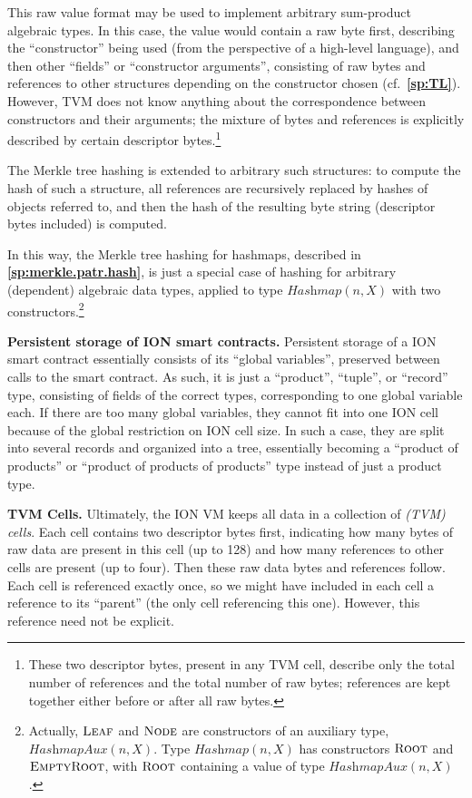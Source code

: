 \documentclass[12pt,oneside]{article}
\def\makepoint#1{\medbreak\noindent{\bf #1.\ }}
\def\nxsubpoint{\refstepcounter{subsubsection}%
  \smallbreak\makepoint{\thesubsubsection}}
\def\refpoint#1{{\rm\textbf{\ref{#1}}}}
\let\ptref=\refpoint
\def\embt(#1.){\textbf{#1.}}
\let\tp=\textit
\def\opsc#1{\operatorname{\textsc{#1}}}
\def\leaf{\opsc{Leaf}}
\def\node{\opsc{Node}}
\def\root{\opsc{Root}}
\def\emptyroot{\opsc{EmptyRoot}}
\def\Hashmap{\tp{Hashmap}}
\begin{document}
This raw value format may be used to implement arbitrary sum-product
algebraic types. In this case, the value would contain a raw byte
first, describing the ``constructor'' being used (from the perspective
of a high-level language), and then other ``fields'' or ``constructor
arguments'', consisting of raw bytes and references to other
structures depending on the constructor chosen
(cf.~\ptref{sp:TL}). However, TVM does not know anything about the
correspondence between constructors and their arguments; the mixture
of bytes and references is explicitly described by certain descriptor
bytes.\footnote{These two descriptor bytes, present in any TVM cell,
  describe only the total number of references and the total number of
  raw bytes; references are kept together either before or after all
  raw bytes.}

The Merkle tree hashing is extended to arbitrary such structures: to
compute the hash of such a structure, all references are recursively
replaced by hashes of objects referred to, and then the hash of the
resulting byte string (descriptor bytes included) is computed.

In this way, the Merkle tree hashing for hashmaps, described in
\ptref{sp:merkle.patr.hash}, is just a special case of hashing for
arbitrary (dependent) algebraic data types, applied to type
$\Hashmap(n,X)$ with two constructors.\footnote{Actually, $\leaf$ and
  $\node$ are constructors of an auxiliary type,
  $\tp{HashmapAux}(n,X)$. Type $\Hashmap(n,X)$ has constructors
  $\root$ and $\emptyroot$, with $\root$ containing a value of type
  $\tp{HashmapAux}(n,X)$.}

\nxsubpoint \embt(Persistent storage of ION smart contracts.)
Persistent storage of a ION smart contract essentially consists of its
``global variables'', preserved between calls to the smart
contract. As such, it is just a ``product'', ``tuple'', or ``record''
type, consisting of fields of the correct types, corresponding to one
global variable each. If there are too many global variables, they
cannot fit into one ION cell because of the global restriction on ION
cell size. In such a case, they are split into several records and
organized into a tree, essentially becoming a ``product of products''
or ``product of products of products'' type instead of just a product
type.

\nxsubpoint\label{sp:tvm.cells} \embt(TVM Cells.)  Ultimately, the ION
VM keeps all data in a collection of {\em (TVM) cells}. Each cell
contains two descriptor bytes first, indicating how many bytes of raw
data are present in this cell (up to 128) and how many references to
other cells are present (up to four). Then these raw data bytes and
references follow. Each cell is referenced exactly once, so we might
have included in each cell a reference to its ``parent'' (the only
cell referencing this one). However, this reference need not be
explicit.
\end{document}
